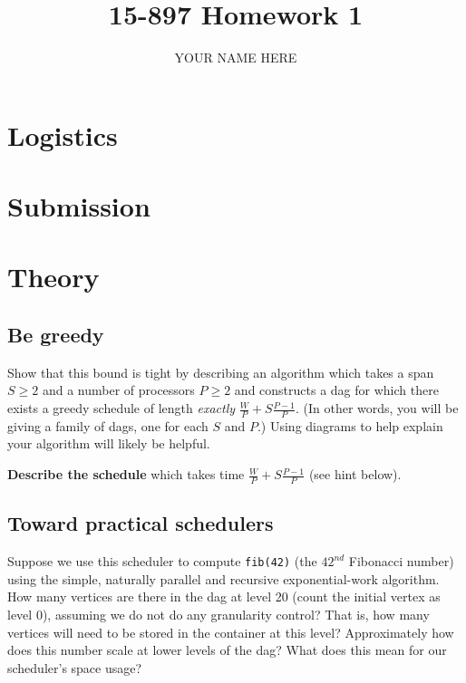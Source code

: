 \documentclass{article}
\title{15-897 Homework 1}
\author{YOUR NAME HERE}
\begin{document}
\maketitle

\section{Logistics}
\section{Submission}
\section{Theory}
\subsection{Be greedy}
\begin{task} 
Show that this bound is tight by describing an algorithm which takes a span
$S \geq 2$
and a number of processors $P \geq 2$ and constructs a dag for which there
exists a greedy schedule of length {\em exactly} $\frac{W}{P} + S\frac{P-1}{P}$.
(In other words, you will be giving a family of dags, one for each $S$ and $P$.)
Using diagrams to help explain your algorithm will likely be helpful.

\textbf{Describe the schedule} which takes time $\frac{W}{P} + S\frac{P-1}{P}$
(see hint below).
\end{task}
\begin{sol}
\end{sol}

\subsection{Toward practical schedulers}
\begin{task} 
Suppose we use this scheduler to compute
\texttt{fib(42)} (the $42^{nd}$ Fibonacci number) using the simple,
naturally parallel and recursive exponential-work algorithm.
How many vertices are there in the dag at level 20 (count the initial vertex
as level 0), assuming we do not do any granularity control? That is, how many
vertices will need to be stored in the container at this level?
Approximately how does this number scale at lower levels of the dag? What
does this mean for our scheduler's space usage?
\end{task}
\begin{sol}
\end{sol}
\end{document}
